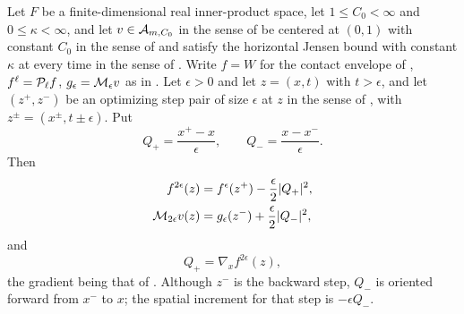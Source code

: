 \begin{lemma}
Let $F$ be a finite-dimensional real inner-product space, let
$1\le C_0<\infty$ and $0\le\kappa<\infty$, and let $v\in\mathcal{A}_{m,C_0}$ in the
sense of  be centered at $(0,1)$ with constant $C_0$ in the
sense of  and satisfy the horizontal Jensen bound with
constant $\kappa$ at every time in the sense of . Write
$f=W$ for the contact envelope of , $f^\ell=\mathcal{P}_\ell f$,
$g_\epsilon=\mathcal{M}_\epsilon v$ as in . Let $\epsilon>0$ and let
$z=(x,t)$ with $t>\epsilon$, and let $(z^+,z^-)$ be an optimizing step pair of
size $\epsilon$ at $z$ in the sense of , with
$z^\pm=(x^\pm,t\pm\epsilon)$. Put
\begin{equation}\label{eq:dp-velocities}
  Q_+=\frac{x^+-x}{\epsilon},\qquad
  Q_-=\frac{x-x^-}{\epsilon}.
\end{equation}
Then
\begin{equation}\label{eq:dp-step-choice}
\begin{aligned}
  f^{2\epsilon}(z)&=f^\epsilon(z^+)-\frac{\epsilon}{2}|Q_+|^2,\\
  \mathcal{M}_{2\epsilon}v(z)&=g_\epsilon(z^-)+\frac{\epsilon}{2}|Q_-|^2,
\end{aligned}
\end{equation}
and
\[
  Q_+=\nabla_xf^{2\epsilon}(z),
\]
the gradient being that of . Although $z^-$ is the
backward step, $Q_-$ is oriented forward from $x^-$ to $x$; the spatial increment
for that step is $-\epsilon Q_-$.
\end{lemma}
